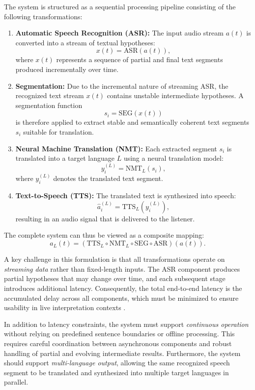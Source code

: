 The system is structured as a sequential processing pipeline consisting of the following transformations:

\begin{enumerate}
    \item \textbf{Automatic Speech Recognition (ASR):}  
    The input audio stream $a(t)$ is converted into a stream of textual hypotheses:
    \[
    x(t) = \text{ASR}(a(t)),
    \]
    where $x(t)$ represents a sequence of partial and final text segments produced incrementally over time.

    \item \textbf{Segmentation:}  
    Due to the incremental nature of streaming ASR, the recognized text stream $x(t)$ contains unstable intermediate hypotheses. A segmentation function
    \[
    s_i = \text{SEG}(x(t))
    \]
    is therefore applied to extract stable and semantically coherent text segments $s_i$ suitable for translation.

    \item \textbf{Neural Machine Translation (NMT):}  
    Each extracted segment $s_i$ is translated into a target language $L$ using a neural translation model:
    \[
    y_i^{(L)} = \text{NMT}_L(s_i),
    \]
    where $y_i^{(L)}$ denotes the translated text segment.

    \item \textbf{Text-to-Speech (TTS):}  
    The translated text is synthesized into speech:
    \[
    \hat{a}_i^{(L)} = \text{TTS}_L(y_i^{(L)}),
    \]
    resulting in an audio signal that is delivered to the listener.
\end{enumerate}

The complete system can thus be viewed as a composite mapping:
\[
\hat{a}_L(t) = (\text{TTS}_L \circ \text{NMT}_L \circ \text{SEG} \circ \text{ASR})(a(t)).
\]

A key challenge in this formulation is that all transformations operate on \emph{streaming data} rather than fixed-length inputs. The ASR component produces partial hypotheses that may change over time, and each subsequent stage introduces additional latency. Consequently, the total end-to-end latency is the accumulated delay across all components, which must be minimized to ensure usability in live interpretation contexts \cite{ma2019staclarxiv}.

In addition to latency constraints, the system must support \emph{continuous operation} without relying on predefined sentence boundaries or offline processing. This requires careful coordination between asynchronous components and robust handling of partial and evolving intermediate results. Furthermore, the system should support \emph{multi-language output}, allowing the same recognized speech segment to be translated and synthesized into multiple target languages in parallel.

